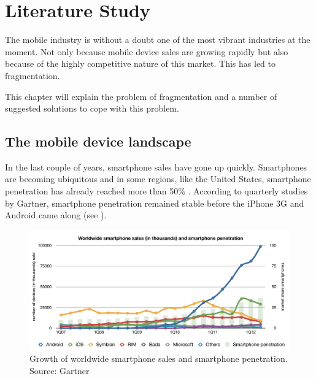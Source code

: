\chapter{Literature Study}
\label{chap:literature}

\npar The mobile industry is without a doubt one of the most vibrant industries at the moment. Not only because mobile device sales are growing rapidly but also because of the highly competitive nature of this market. This has led to fragmentation. 

\npar This chapter will explain the problem of fragmentation and a number of suggested solutions to cope with this problem.

\section{The mobile device landscape}

\npar In the last couple of years, smartphone sales have gone up quickly. Smartphones are becoming ubiquitous and in some regions, like the United States, smartphone penetration has already reached more than 50\% \cite{nielsen}. According to quarterly studies by Gartner, smartphone penetration remained stable before the iPhone 3G and Android came along (see ).

\begin{figure}
    \begin{center}
        \includegraphics[width=\textwidth]{figs/smartphone_sales.pdf}
        	\caption{
        	    	Growth of worldwide smartphone sales and smartphone penetration. Source: Gartner \citep{Gartner:07Q1,Gartner:07Q2,Gartner:07Q3,Gartner:07Q4,Gartner:08Q1,Gartner:08Q2,Gartner:08Q3,Gartner:08Q4,Gartner:09Q1,Gartner:09Q2,Gartner:09Q3,Gartner:09Q4,Gartner:10Q1,Gartner:10Q2,Gartner:10Q3,Gartner:10Q4,Gartner:11Q1,Gartner:11Q2,Gartner:11Q3,Gartner:11Q4,Gartner:12Q1,Gartner:12Q2}
        	}
        	\label{fig:smartphone_sales}
    \end{center}
\end{figure}

